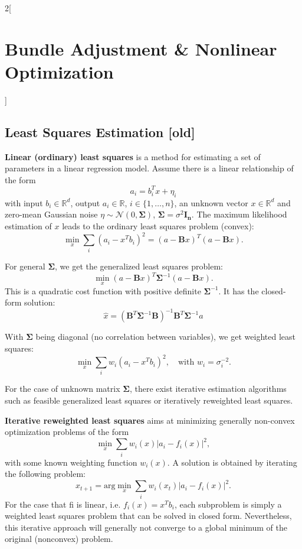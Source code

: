 \documentclass[oneside,fontsize=11pt,paper=a4]{scrartcl}
\begin{document}
\begin{multicols}{2}[\section{Bundle Adjustment \& Nonlinear Optimization}]
\subsection{Least Squares Estimation [old]}
\textbf{Linear (ordinary) least squares} is a method for estimating a set of parameters in a linear regression model.
Assume there is a linear relationship of the form
\begin{equation*}
	a_i = b_i^T x + \eta_i
\end{equation*}
with input $b_i \in \mathbb{R}^d$, output $a_i \in \mathbb{R}$, $i \in \{1,\dots,n\}$, an unknown vector $x \in \mathbb{R}^d$ and zero-mean Gaussian noise $\eta \sim \mathcal{N}(0,\boldsymbol{\Sigma})$, $\boldsymbol{\Sigma} = \sigma^2 \boldsymbol{I_n}$.
The maximum likelihood estimation of $x$ leads to the ordinary least squares problem (convex):
\begin{equation*}
	\min_{x} \sum_{i} (a_i - x^T b_i)^2 = (a-\boldsymbol{B}x)^T (a - \boldsymbol{B}x).
\end{equation*}

For general $\boldsymbol{\Sigma}$, we get the generalized least squares problem:
\begin{equation*}
    \min_{x} (a-\boldsymbol{B}x)^T \boldsymbol{\Sigma}^{-1} (a - \boldsymbol{B}x).
\end{equation*}
This is a quadratic cost function with positive definite $\boldsymbol{\Sigma}^{-1}$.
It has the closed-form solution:
\begin{equation*}
    \hat{x} = (\boldsymbol{B}^T \boldsymbol{\Sigma}^{-1} \boldsymbol{B})^{-1} \boldsymbol{B}^T \boldsymbol{\Sigma}^{-1} a
\end{equation*}

With $\boldsymbol{\Sigma}$ being diagonal (no correlation between variables), we get weighted least squares:
\begin{equation*}
	\min_{x} \sum_{i} w_i (a_i - x^T b_i)^2, \quad \text{with } w_i = \sigma_i^{-2}.
\end{equation*}

For the case of unknown matrix $\boldsymbol{\Sigma}$, there exist iterative estimation algorithms such as feasible generalized least squares or iteratively reweighted least squares.\par

\textbf{Iterative reweighted least squares} aims at minimizing generally non-convex optimization problems of the form
\begin{equation*}
	\min_{x} \sum_i w_i(x) |a_i - f_i(x)|^2,
\end{equation*}
with some known weighting function $w_i(x)$.
A solution is obtained by iterating the following problem:
\begin{equation*}
	x_{t+1} = \text{arg}\min_{x} \sum_i w_i(x_t) |a_i - f_i(x)|^2.
\end{equation*}
For the case that fi is linear, i.e. $f_i(x) = x^T b_i$, each subproblem is simply a weighted least squares problem that can be solved in closed form.
Nevertheless, this iterative approach will generally not converge to a global minimum of the original (nonconvex) problem.\par


\end{multicols}
\end{document}
